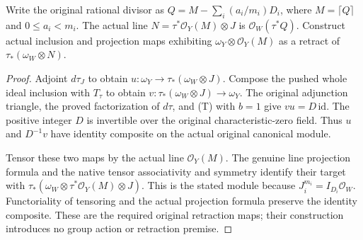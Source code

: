 \begin{lemma}
\label{lem:kn-nadel-trace-rounded-retraction}
\notready
Write the original rational divisor as
$Q=M-\sum_i(a_i/m_i)D_i$, where $M=\lceil Q\rceil$ and
$0\leq a_i<m_i$.  The actual line
$N=\tau^*\mathcal O_Y(M)\otimes J$ is $\mathcal O_W(\tau^*Q)$.
Construct actual inclusion and projection maps exhibiting
$\omega_Y\otimes\mathcal O_Y(M)$ as a retract of
$\tau_*(\omega_W\otimes N)$.
\end{lemma}
\begin{proof}
Adjoint $d\tau_J$ to obtain
$u:\omega_Y\to\tau_*(\omega_W\otimes J)$.  Compose the pushed whole
ideal inclusion with $T_\tau$ to obtain
$v:\tau_*(\omega_W\otimes J)\to\omega_Y$.
The original adjunction triangle, the proved factorization of $d\tau$,
and (T) with $b=1$ give $vu=D\,\mathrm{id}$.  The positive integer $D$
is invertible over the original characteristic-zero field.  Thus $u$
and $D^{-1}v$ have identity composite on the actual original canonical
module.

Tensor these two maps by the actual line $\mathcal O_Y(M)$.  The genuine
line projection formula and the native tensor associativity and symmetry
identify their target with
$\tau_*(\omega_W\otimes\tau^*\mathcal O_Y(M)\otimes J)$.
This is the stated module because $J_i^{m_i}=I_{D_i}\mathcal O_W$.
Functoriality of tensoring and the actual projection formula preserve
the identity composite.  These are the required original retraction
maps; their construction introduces no group action or retraction
premise.
\end{proof}
